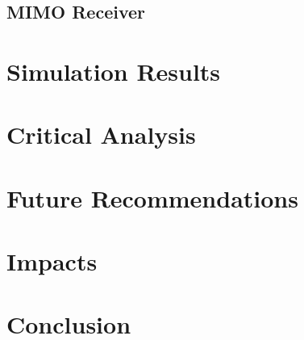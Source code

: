 \documentclass[pdftex,11pt,a4paper]{article}
\begin{document}
\subsection{MIMO Receiver}


\section{Simulation Results}
\section{Critical Analysis}

\section{Future Recommendations}
\section{Impacts}

\section{Conclusion}
\newpage


\end{document}

